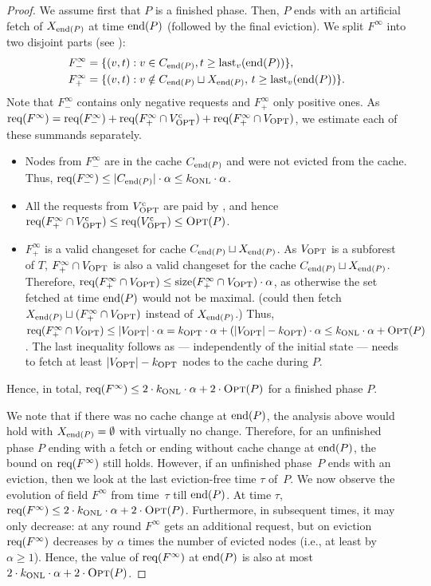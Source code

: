 \begin{proof}
We assume first that $P$ is a finished phase. Then, $P$ ends with an
artificial fetch of $X_{\textrm{end}(P)}$ at time $\textrm{end}(P)$ (followed by the final eviction).
We split $F^\infty$ into two disjoint parts (see ):
\begin{align*}
  F^\infty_- = &\; \{(v, t): v \in C_{\textrm{end}(P)}, t \geq \textrm{last}_v(\textrm{end}(P))\}, \\
  F^\infty_+ = &\; \{(v, t): v \notin C_{\textrm{end}(P)} \sqcup X_{\textrm{end}(P)}, \,
           t \geq \textrm{last}_v(\textrm{end}(P))\}.
\end{align*}
Note that $F^\infty_-$ contains only negative requests and $F^\infty_+$ only
positive ones. As $\textrm{req}(F^\infty) = \textrm{req}(F^\infty_-) + \textrm{req} (F^\infty_+ \cap
V_\textnormal{OPT}^\textrm{c}) + \textrm{req} (F^\infty_+ \cap V_\textnormal{OPT})$, we estimate each of these summands
separately.
\begin{itemize}
\item
Nodes from $F^\infty_-$ are in the cache $C_{\textrm{end}(P)}$ and were not
evicted from the cache. Thus, $\textrm{req}(F^{\infty}_-) \leq |C_{\textrm{end}(P)}| \cdot \alpha
\leq k_\textnormal{ONL} \cdot \alpha$.
\item
All the requests from $V_\textnormal{OPT}^\textrm{c}$ are paid by \OPT, and hence
$\textrm{req}(F^\infty_+ \cap V_\textnormal{OPT}^\textrm{c}) \leq \textrm{req}(V_\textnormal{OPT}^\textrm{c}) \leq \textsc{Opt}(P)$.
\item
$F^\infty_+$ is a valid changeset for cache $C_{\textrm{end}(P)} \sqcup X_{\textrm{end}(P)}$.
As $V_\textnormal{OPT}$ is a subforest of $T$, $F^\infty_+ \cap V_\textnormal{OPT}$ is also a valid
changeset for the cache $C_{\textrm{end}(P)} \sqcup X_{\textrm{end}(P)}$. Therefore, $\textrm{req}
(F^\infty_+ \cap V_\textnormal{OPT}) \leq \textrm{size}(F^\infty_+ \cap V_\textnormal{OPT}) \cdot \alpha$, as
otherwise the set fetched at time $\textrm{end}(P)$ would not be maximal. (\ALGTC could
then fetch $X_{\textrm{end}(P)} \sqcup (F^\infty_+ \cap V_\textnormal{OPT})$ instead of $X_{\textrm{end}(P)}$.)
Thus, $\textrm{req} (F^\infty_+ \cap V_\textnormal{OPT}) \leq |V_\textnormal{OPT}| \cdot \alpha = k_\textnormal{OPT} \cdot
\alpha + (|V_\textnormal{OPT}| - k_\textnormal{OPT})
\cdot \alpha \leq k_\textnormal{ONL} \cdot \alpha + \textsc{Opt}(P)$.
The last inequality follows as --- independently of the initial state --- \OPT
needs to fetch at least $|V_\textnormal{OPT}| - k_\textnormal{OPT}$ nodes to the cache during $P$.
\end{itemize}
Hence, in total, $\textrm{req} (F^\infty) \leq 2 \cdot k_\textnormal{ONL} \cdot
\alpha + 2 \cdot \textsc{Opt}(P)$ for a finished phase $P$.

We note that if there was no cache change at $\textrm{end}(P)$, the analysis above would
hold with $X_{\textrm{end}(P)} = \emptyset$ with virtually no change. Therefore, for an
unfinished phase $P$ ending with a fetch or ending without cache change at
$\textrm{end}(P)$, the bound on $\textrm{req}(F^\infty)$ still holds. However, if an unfinished
phase~$P$ ends with an eviction, then we look at the last eviction-free 
time $\tau$ of~$P$. We now observe the evolution of field
$F^\infty$ from time~$\tau$ till $\textrm{end}(P)$. At time $\tau$, $\textrm{req}(F^\infty) \leq
2 \cdot k_\textnormal{ONL} \cdot \alpha + 2 \cdot \textsc{Opt}(P)$. Furthermore, in subsequent
times, it may only decrease: at any round $F^\infty$ gets an additional
request, but on eviction $\textrm{req}(F^\infty)$ decreases by $\alpha$ times
the number of evicted nodes (i.e., at least by $\alpha \geq 1$). Hence, the
value of $\textrm{req}(F^\infty)$ at $\textrm{end}(P)$ is also at most $2 \cdot k_\textnormal{ONL} \cdot
\alpha + 2 \cdot \textsc{Opt}(P)$.
\end{proof}



